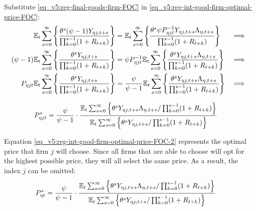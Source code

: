 \documentclass[../thesis.tex]{subfiles}
\begin{document}
Substitute \ref{eq_v5:reg-final-goods-firm-FOC} in \ref{eq_v5:reg-int-good-firm-optimal-price-FOC}:
\begin{alignat}{2}
	{\mathbb{E}_{t}} \sum_{s=0}^{\infty} \Bigg\{ \frac{\theta^s (\psi-1) Y_{\eta j,t+s}}{\prod_{k=0}^{s-1}(1+R_{t+k})} \Bigg\} &= {\mathbb{E}_{t}} \sum_{s=0}^{\infty} \Bigg\{ \frac{\theta^s \psi P_{\eta jt}^{-1} Y_{\eta j,t+s} \Lambda_{\eta, t+s}}{\prod_{k=0}^{s-1}(1+R_{t+k})}  \Bigg\} &\implies \nonumber \\
	(\psi-1) {\mathbb{E}_{t}} \sum_{s=0}^{\infty} \Bigg\{ \frac{\theta^s Y_{\eta j,t+s}}{\prod_{k=0}^{s-1}(1+R_{t+k})} \Bigg\} &= \psi P_{\eta jt}^{-1} {\mathbb{E}_{t}} \sum_{s=0}^{\infty} \Bigg\{ \frac{\theta^s Y_{\eta j,t+s} \Lambda_{\eta, t+s}}{\prod_{k=0}^{s-1}(1+R_{t+k})}  \Bigg\} &\implies \nonumber \\
	P_{\eta jt} {\mathbb{E}_{t}} \sum_{s=0}^{\infty} \Bigg\{ \frac{\theta^s Y_{\eta j,t+s}}{\prod_{k=0}^{s-1}(1+R_{t+k})} \Bigg\} &= \frac{\psi}{\psi-1} {\mathbb{E}_{t}} \sum_{s=0}^{\infty} \Bigg\{ \frac{\theta^s Y_{\eta j,t+s} \Lambda_{\eta, t+s}}{\prod_{k=0}^{s-1}(1+R_{t+k})}  \Bigg\} &\implies \nonumber
\end{alignat}

\vspace*{-1cm}

\begin{align}
	\label{eq_v5:reg-int-good-firm-optimal-price-FOC-2}
	P_{\eta jt}^{\ast} &= 
	\frac{\psi}{\psi-1} \cdot
	\frac{
		{\mathbb{E}_{t}} \sum_{s=0}^{\infty} \left\{ 
		\theta^s Y_{\eta j,t+s} \Lambda_{\eta, t+s} / \prod_{k=0}^{s-1}(1+R_{t+k}) \right\}} {{\mathbb{E}_{t}} \sum_{s=0}^{\infty} \left\{
		\theta^s Y_{\eta j,t+s} / \prod_{k=0}^{s-1}(1+R_{t+k}) \right\}}
\end{align}


Equation \ref{eq_v5:reg-int-good-firm-optimal-price-FOC-2} represents the optimal price that firm $j$ will choose. Since all firms that are able to choose will opt for the highest possible price, they will all select the same price. As a result, the index $j$ can be omitted:
\begin{align}
	\label{eq_v5:reg-int-good-firm-optimal-price-FOC-3}
	P_{\eta t}^{\ast} &= 
	\frac{\psi}{\psi-1} \cdot
	\frac{
		{\mathbb{E}_{t}} \sum_{s=0}^{\infty} \left\{ 
		\theta^s Y_{\eta j,t+s} \Lambda_{\eta, t+s} / \prod_{k=0}^{s-1}(1+R_{t+k}) \right\}} {{\mathbb{E}_{t}} \sum_{s=0}^{\infty} \left\{
		\theta^s Y_{\eta j,t+s} / \prod_{k=0}^{s-1}(1+R_{t+k}) \right\}}
\end{align}

\end{document}
